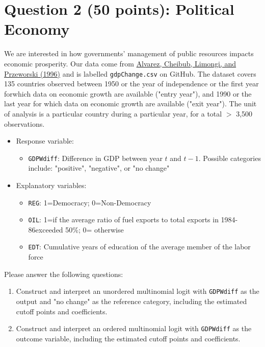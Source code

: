 \documentclass[12pt,letterpaper]{article}
\begin{document}
\section*{Question 2 (50 points): Political Economy}
\vspace{.25cm}
\noindent We are interested in how governments' management of public resources impacts economic prosperity. Our data come from \href{https://www.researchgate.net/profile/Adam_Przeworski/publication/240357392_Classifying_Political_Regimes/links/0deec532194849aefa000000/Classifying-Political-Regimes.pdf}{Alvarez, Cheibub, Limongi, and Przeworski (1996)} and is labelled \texttt{gdpChange.csv} on GitHub. The dataset covers 135 countries observed between 1950 or the year of independence or the first year forwhich data on economic growth are available ("entry year"), and 1990 or the last year for which data on economic growth are available ("exit year"). The unit of analysis is a particular country during a particular year, for a total $>$ 3,500 observations. 

\begin{itemize}
	\item
	Response variable: 
	\begin{itemize}
		\item \texttt{GDPWdiff}: Difference in GDP between year $t$ and $t-1$. Possible categories include: "positive", "negative", or "no change"
	\end{itemize}
	\item
	Explanatory variables: 
	\begin{itemize}
		\item
		\texttt{REG}: 1=Democracy; 0=Non-Democracy
		\item
		\texttt{OIL}: 1=if the average ratio of fuel exports to total exports in 1984-86exceeded 50\%; 0= otherwise
		\item \texttt{EDT}: Cumulative years of education of the average member of the labor force
	\end{itemize}
	
\end{itemize}

\noindent Please answer the following questions:

\begin{enumerate}
	\item Construct and interpret an unordered multinomial logit with \texttt{GDPWdiff} as the output and "no change" as the reference category, including the estimated cutoff points and coefficients.
	\item Construct and interpret an ordered multinomial logit with \texttt{GDPWdiff} as the outcome variable, including the estimated cutoff points and coefficients.
	
	
\end{enumerate}
\end{document}
